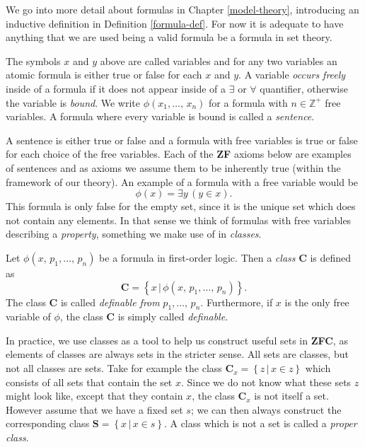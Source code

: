 \documentclass[../../main.tex]{subfiles}
\begin{document}
We go into more detail about formulas in Chapter \ref{model-theory}, introducing an inductive definition in Definition \ref{formula-def}.
For now it is adequate to have anything that we are used being a valid formula be a formula in set theory.

The symbols $x$ and $y$ above are called variables and for any two variables an atomic formula is either true or false for each $x$ and $y$.
A variable \textit{occurs freely} inside of a formula if it does not appear inside of a $\exists$ or $\forall$ quantifier, otherwise the variable is \textit{bound}.
We write $\phi\left(x_1,\ldots,\, x_n\right)$ for a formula with $n \in \mathbb{Z}^+$ free variables.
A formula where every variable is bound is called a \textit{sentence}. \cite[pp.10-11]{Mar02}

A sentence is either true or false and a formula with free variables is true or false for each choice of the free variables.
Each of the \textbf{ZF} axioms below are examples of sentences and as axioms we assume them to be inherently true (within the framework of our theory).
An example of a formula with a free variable would be $$\phi(x) = \exists y \, \left(y \in x\right).$$ 
This formula is only false for the empty set, since it is the unique set which does not contain any elements.
In that sense we think of formulas with free variables describing a \textit{property}, something we make use of in \textit{classes}.

\begin{definition}[Class]
    Let $\phi\left(x,\, p_1,\ldots,\, p_n\right)$ be a formula in first-order logic.
    Then a \textit{class} $\mathbf{C}$ is defined as
    $$\mathbf{C} = \left\{x \,\vert\, \phi\left(x,\, p_1,\ldots,\, p_n\right)\right\}.$$
    The class $\mathbf{C}$ is called \textit{definable from} $p_1,\ldots,\, p_n$.
    Furthermore, if $x$ is the only free variable of $\phi$, the class $\mathbf{C}$ is simply called \textit{definable}. \cite[p.3]{Jec78}
\end{definition}

In practice, we use classes as a tool to help us construct useful sets in \textbf{ZFC}, as elements of classes are always sets in the stricter sense.
All sets are classes, but not all classes are sets.
Take for example the class $\mathbf{C}_x = \left\{z \,\vert\, x \in z\right\}$ which consists of all sets that contain the set $x$.
Since we do not know what these sets $z$ might look like, except that they contain $x$, the class $\mathbf{C}_x$ is not itself a set.
However assume that we have a fixed set $s$; we can then always construct the corresponding class $\mathbf{S} = \left\{x \,\vert\, x \in s\right\}$.
A class which is not a set is called a \textit{proper class}.
\end{document}
